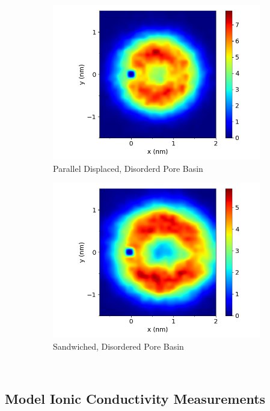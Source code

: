 \documentclass[journal=jpcbfk,manusciprt=article]{achemso}
\begin{document}
\begin{figure}
\begin{subfigure}{0.47\textwidth}
        \includegraphics[width=1\linewidth]{offset_xy_correlation.png}
        \caption{Parallel Displaced, Disorderd Pore Basin}
        \label{fig:offset_xy_correlation_comparison}
  \end{subfigure}
  \begin{subfigure}{0.47\textwidth}
        \includegraphics[width=1\linewidth]{offset_solvated_xy_correlation.png}
        \caption{Sandwiched, Disordered Pore Basin}
        \label{fig:offset_solvated_xy_correlation}
  \end{subfigure}
  \caption{}~\label{fig:solvated_correlation}
  \end{figure}

  \subsection{Model Ionic Conductivity Measurements}
\end{document}

